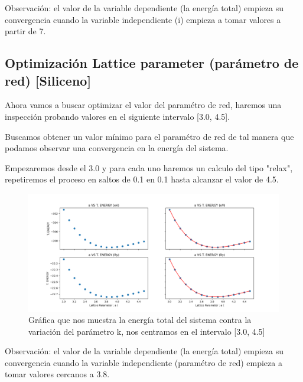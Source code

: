 Observación: el valor de la variable dependiente (la energía total) empieza su convergencia cuando 
la variable independiente (i) empieza a tomar valores a partir de 7.




\subsection{Optimización Lattice parameter (parámetro de red) [Siliceno]}

Ahora vamos a buscar optimizar el valor del paramétro de red, haremos una inspección probando valores
en el siguiente intervalo [3.0, 4.5].
 
\vspace{0.5cm}

Buscamos obtener un valor mínimo para el paramétro de red de tal manera que podamos observar una convergencia 
en la energía del sistema.

\vspace{0.5cm}

Empezaremos desde el 3.0 y para cada uno haremos un calculo del tipo "relax", repetiremos el proceso
en saltos de 0.1 en 0.1 hasta alcanzar el valor de 4.5.

\begin{figure}[H]
    \centering
    \includegraphics[scale=0.5]{images_siliceno/lattice_parameter_vs_T_energy.png}
    \caption{Gráfica que nos muestra la energía total del sistema contra la variación del parámetro k, nos centramos en el intervalo [3.0, 4.5]}
\end{figure}

Observación: el valor de la variable dependiente (la energía total) empieza su convergencia cuando 
la variable independiente (paramétro de red) empieza a tomar valores cercanos a 3.8.

\newpage

